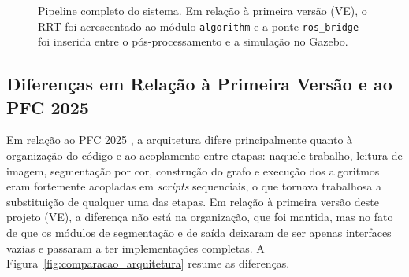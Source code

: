 \documentclass[
    12pt,
    openright,
    oneside,
    a4paper,
    english,
    brazil
]{abntex2}
\begin{document}
\begin{figure}[H]
{}
    \caption{Pipeline completo do sistema. Em relação à primeira versão (VE), o RRT foi acrescentado ao módulo \texttt{algorithm} e a ponte \texttt{ros\_bridge} foi inserida entre o pós-processamento e a simulação no Gazebo.}
    \label{fig:pipeline}
\end{figure}

\subsection{Diferenças em Relação à Primeira Versão e ao PFC 2025}
\label{subsec:diferencas}

Em relação ao PFC 2025 \cite{camelo2025}, a arquitetura difere principalmente quanto à organização do código e ao acoplamento entre etapas: naquele trabalho, leitura de imagem, segmentação por cor, construção do grafo e execução dos algoritmos eram fortemente acopladas em \textit{scripts} sequenciais, o que tornava trabalhosa a substituição de qualquer uma das etapas. Em relação à primeira versão deste projeto (VE), a diferença não está na organização, que foi mantida, mas no fato de que os módulos de segmentação e de saída deixaram de ser apenas interfaces vazias e passaram a ter implementações completas. A Figura~\ref{fig:comparacao_arquitetura} resume as diferenças.
\end{document}
